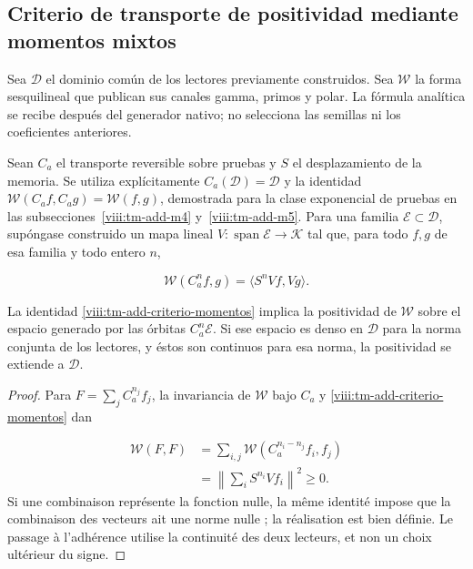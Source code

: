\subsection{Criterio de transporte de positividad mediante momentos mixtos}
\label{viii:tm-add-c5}
Sea \(\mathcal D\) el dominio común de los lectores previamente construidos. Sea \(\mathscr W\) la forma sesquilineal que publican sus canales gamma, primos y polar. La fórmula analítica se recibe después del generador nativo; no selecciona las semillas ni los coeficientes anteriores.

Sean \(C_a\) el transporte reversible sobre pruebas y \(S\) el desplazamiento de la memoria. Se utiliza explícitamente \(C_a(\mathcal D)=\mathcal D\) y la identidad \(\mathscr W(C_af,C_ag)=\mathscr W(f,g)\), demostrada para la clase exponencial de pruebas en las subsecciones~\ref{viii:tm-add-m4} y~\ref{viii:tm-add-m5}. Para una familia \(\mathcal E\subset\mathcal D\), supóngase construido un mapa lineal \(V:\operatorname{span}\mathcal E\to\mathcal K\) tal que, para todo \(f,g\) de esa familia y todo entero \(n\),

\begin{equation}
\boxed{\mathscr W(C_a^n f,g)=\langle S^nVf,Vg\rangle.}
\label{viii:tm-add-criterio-momentos}
\end{equation}
\begin{proposition}
\label{viii:tm-add-proposicion-costura-3}
La identidad \eqref{viii:tm-add-criterio-momentos} implica la positividad de \(\mathscr W\) sobre el espacio generado por las órbitas \(C_a^n\mathcal E\). Si ese espacio es denso en \(\mathcal D\) para la norma conjunta de los lectores, y éstos son continuos para esa norma, la positividad se extiende a \(\mathcal D\).
\end{proposition}

\begin{proof}
Para \(F=\sum_j C_a^{n_j}f_j\), la invariancia de \(\mathscr W\) bajo \(C_a\) y \eqref{viii:tm-add-criterio-momentos} dan

\[
\begin{aligned}
\mathscr W(F,F)
&=\sum_{i,j}\mathscr W(C_a^{n_i-n_j}f_i,f_j)\\
&=\left\|\sum_i S^{n_i}Vf_i\right\|^2\geq0.
\end{aligned}
\]
Si une combinaison représente la fonction nulle, la même identité impose que la combinaison des vecteurs ait une norme nulle ; la réalisation est bien définie. Le passage à l'adhérence utilise la continuité des deux lecteurs, et non un choix ultérieur du signe.
\end{proof}


